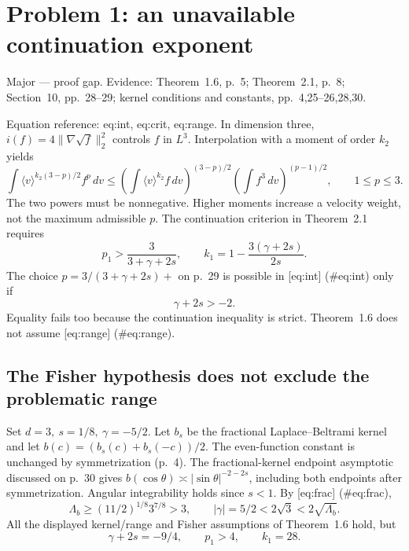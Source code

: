 \documentclass[10pt]{article}
\begin{document}
\section*{Problem 1: an unavailable continuation exponent}
Major — proof gap. Evidence: Theorem 1.6, p. 5; Theorem 2.1, p. 8; Section 10, pp. 28–29; kernel conditions and constants, pp. 4,25–26,28,30.\par
Equation reference: eq:int, eq:crit, eq:range. In dimension three, \(i(f)=4\|\nabla\sqrt f\|_2^2\) controls \(f\) in \(L^3\). Interpolation with a moment of order \(k_2\) yields \[
 \int\langle v\rangle^{k_2(3-p)/2}f^p\,dv
 \leq
 \left(\int\langle v\rangle^{k_2}f\,dv\right)^{(3-p)/2}
 \left(\int f^3\,dv\right)^{(p-1)/2},\qquad 1\leq p\leq3.\] The two powers must be nonnegative. Higher moments increase a velocity weight, not the maximum admissible \(p\). The continuation criterion in Theorem 2.1 requires \[
 p_1>\frac3{3+\gamma+2s},\qquad k_1=1-\frac{3(\gamma+2s)}{2s}.\] The choice \(p=3/(3+\gamma+2s)+\) on p. 29 is possible in [eq:int] (\#eq:int) only if \[
 \gamma+2s>-2.\] Equality fails too because the continuation inequality is strict. Theorem 1.6 does not assume [eq:range] (\#eq:range).\par
\subsection*{The Fisher hypothesis does not exclude the problematic range}
Set \(d=3,\ s=1/8,\ \gamma=-5/2\). Let \(b_s\) be the fractional Laplace–Beltrami kernel and let \(b(c)=(b_s(c)+b_s(-c))/2\). The even-function constant is unchanged by symmetrization (p. 4). The fractional-kernel endpoint asymptotic discussed on p. 30 gives \(b(\cos\theta)\asymp|\sin\theta|^{-2-2s}\), including both endpoints after symmetrization. Angular integrability holds since \(s<1\). By [eq:frac] (\#eq:frac), \[\Lambda_b\geq(11/2)^{1/8}3^{7/8}>3,\qquad
 |\gamma|=5/2<2\sqrt3<2\sqrt{\Lambda_b}.\] All the displayed kernel/range and Fisher assumptions of Theorem 1.6 hold, but \[\gamma+2s=-9/4,\qquad p_1>4,\qquad k_1=28 .\]\par
\end{document}

